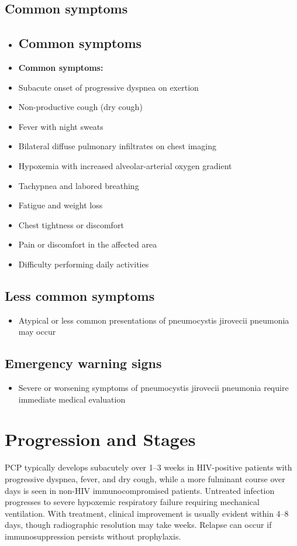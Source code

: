 \subsection{Common symptoms}
\begin{itemize}[noitemsep]
  \item \subsection{Common symptoms}
  \item \textbf{Common symptoms:}
  \item Subacute onset of progressive dyspnea on exertion
  \item Non-productive cough (dry cough)
  \item Fever with night sweats
  \item Bilateral diffuse pulmonary infiltrates on chest imaging
  \item Hypoxemia with increased alveolar-arterial oxygen gradient
  \item Tachypnea and labored breathing
  \item Fatigue and weight loss
  \item Chest tightness or discomfort
  \item Pain or discomfort in the affected area
  \item Difficulty performing daily activities
\end{itemize}

\subsection{Less common symptoms}
\begin{itemize}[noitemsep]
  \item Atypical or less common presentations of pneumocystis jirovecii pneumonia may occur
\end{itemize}

\subsection{Emergency warning signs}
\begin{itemize}[noitemsep]
  \item Severe or worsening symptoms of pneumocystis jirovecii pneumonia require immediate medical evaluation
\end{itemize}
\section{Progression and Stages}
PCP typically develops subacutely over 1--3 weeks in HIV-positive patients with progressive dyspnea, fever, and dry cough, while a more fulminant course over days is seen in non-HIV immunocompromised patients. Untreated infection progresses to severe hypoxemic respiratory failure requiring mechanical ventilation. With treatment, clinical improvement is usually evident within 4--8 days, though radiographic resolution may take weeks. Relapse can occur if immunosuppression persists without prophylaxis.

